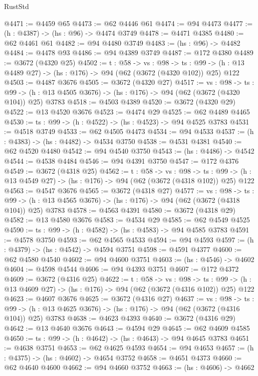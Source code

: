 \begin{lexlean}{RustStd}
\begin{coremodule}
@4471 := @4459 @65
@4473 := @62 @4446 @61
@4474 := @94 @4473
@4477 := (h : @4387) -> (hs : @96) -> @4474 @3749
@4478 := @4471 @4385
@4480 := @62 @4461 @61
@4482 := @94 @4480 @3749
@4483 := (hs : @96) -> @4482
@4484 := @4478 @93
@4486 := @94 @4389 @3749
@4487 := @172 @4380
@4489 := @3672 (@4320 @25)
@4502 := {t : @58} ->
  {vs : @98} ->
  {ts : @99} -> (h : @13 @4489 @27) -> (hs : @176) -> @94 (@62 (@3672 (@4320 @102)) @25) @122
@4503 := @4487 @3676
@4505 := @3672 (@4320 @27)
@4517 := {vs : @98} ->
  {ts : @99} -> (h : @13 @4505 @3676) -> (hs : @176) -> @94 (@62 (@3672 (@4320 @104)) @25) @3783
@4518 := @4503 @4389
@4520 := @3672 (@4320 @29)
@4522 := @13 @4520 @3676
@4523 := @4474 @29
@4525 := @62 @4489 @4465
@4530 := {ts : @99} -> (h : @4522) -> (hs : @4523) -> @94 @4525 @3783
@4531 := @4518 @3749
@4533 := @62 @4505 @4473
@4534 := @94 @4533
@4537 := (h : @4383) -> (hs : @4482) -> @4534 @3750
@4538 := @4531 @4381
@4540 := @62 @4520 @4480
@4542 := @94 @4540 @3750
@4543 := (hs : @4486) -> @4542
@4544 := @4538 @4484
@4546 := @94 @4391 @3750
@4547 := @172 @4376
@4549 := @3672 (@4318 @25)
@4562 := {t : @58} ->
  {vs : @98} ->
  {ts : @99} -> (h : @13 @4549 @27) -> (hs : @176) -> @94 (@62 (@3672 (@4318 @102)) @25) @122
@4563 := @4547 @3676
@4565 := @3672 (@4318 @27)
@4577 := {vs : @98} ->
  {ts : @99} -> (h : @13 @4565 @3676) -> (hs : @176) -> @94 (@62 (@3672 (@4318 @104)) @25) @3783
@4578 := @4563 @4391
@4580 := @3672 (@4318 @29)
@4582 := @13 @4580 @3676
@4583 := @4534 @29
@4585 := @62 @4549 @4525
@4590 := {ts : @99} -> (h : @4582) -> (hs : @4583) -> @94 @4585 @3783
@4591 := @4578 @3750
@4593 := @62 @4565 @4533
@4594 := @94 @4593
@4597 := (h : @4379) -> (hs : @4542) -> @4594 @3751
@4598 := @4591 @4377
@4600 := @62 @4580 @4540
@4602 := @94 @4600 @3751
@4603 := (hs : @4546) -> @4602
@4604 := @4598 @4544
@4606 := @94 @4393 @3751
@4607 := @172 @4372
@4609 := @3672 (@4316 @25)
@4622 := {t : @58} ->
  {vs : @98} ->
  {ts : @99} -> (h : @13 @4609 @27) -> (hs : @176) -> @94 (@62 (@3672 (@4316 @102)) @25) @122
@4623 := @4607 @3676
@4625 := @3672 (@4316 @27)
@4637 := {vs : @98} ->
  {ts : @99} -> (h : @13 @4625 @3676) -> (hs : @176) -> @94 (@62 (@3672 (@4316 @104)) @25) @3783
@4638 := @4623 @4393
@4640 := @3672 (@4316 @29)
@4642 := @13 @4640 @3676
@4643 := @4594 @29
@4645 := @62 @4609 @4585
@4650 := {ts : @99} -> (h : @4642) -> (hs : @4643) -> @94 @4645 @3783
@4651 := @4638 @3751
@4653 := @62 @4625 @4593
@4654 := @94 @4653
@4657 := (h : @4375) -> (hs : @4602) -> @4654 @3752
@4658 := @4651 @4373
@4660 := @62 @4640 @4600
@4662 := @94 @4660 @3752
@4663 := (hs : @4606) -> @4662

\end{coremodule}
\end{lexlean}
